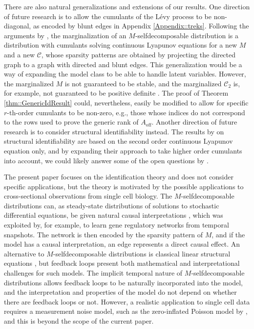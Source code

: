 \documentclass{biometrika}
\begin{document}
There are also natural generalizations and extensions of our results. One direction of
future research is to allow the cumulants of the Lévy process to be non-diagonal,
as encoded by blunt edges in Appendix \ref{Appendix::treks}. Following 
the arguments by \cite{varando20a}, the marginalization of an $M$-selfdecomposable 
distribution is a distribution with cumulants solving continuous Lyapunov equations 
for a new $M$ and a new $\mathcal{C}$, whose sparsity patterns are obtained by 
projecting the directed graph to a graph with directed and blunt edges. This generalization
would be a way of expanding the model class to be able to handle latent variables. 
However, the marginalized $M$ is not guaranteed to be stable, and the marginalized
$\mathcal{C}_2$ is, for example, not guaranteed to be positive definite \citep{varando20a}. 
The proof of Theorem \ref{thm::GenericIdResult} could, nevertheless, easily be modified
to allow for specific $r$-th-order cumulants to be non-zero, e.g., those whose indices
do not correspond to the rows used to prove the generic rank of $A_{\mathrm{off}}$. Another 
direction of future research is to consider structural identifiability instead. The results 
by \cite{amendola2025structuralidentifiabilitygraphicalcontinuous} on structural identifiability 
are based on the second order continuous Lyapunov equation only, and by expanding their 
approach to take higher order cumulants into account, we could likely answer some of the 
open questions by \cite{amendola2025structuralidentifiabilitygraphicalcontinuous}. 

The present paper focuses on the identification theory and does not consider specific 
applications, but the theory is motivated by the possible applications to cross-sectional 
observations from single cell biology. The $M$-selfdecomposable distributions can, as 
steady-state distributions of solutions to stochastic differential equations, be given 
natural causal interpretations \citep{Sokol:2014, varando20a}, which was exploited by, for example, 
\cite{Wang:2023aa} to learn gene regulatory networks from temporal snapshots. 
The network is then encoded by the sparsity pattern of $M$, and if the model has a 
causal interpretation, an edge represents a direct causal effect. An alternative to 
$M$-selfdecomposable distributions is classical linear structural equations
\citep{DrtonOversigt}, but feedback loops present both mathematical and interpretational 
challenges for such models. The implicit temporal nature of $M$-selfdecomposable distributions
allows feedback loops to be naturally incorporated into the model, and the 
interpretation and properties of the model do not depend on whether there are feedback 
loops or not. However, a realistic application to single cell data requires a measurement 
noise model, such as the zero-inflated Poisson model by \cite{lorch_latent_2026}, and this is 
beyond the scope of the current paper.
\end{document}
